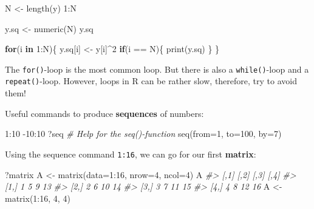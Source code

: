 \documentclass[
  14pt,
]{memoir}
\newenvironment{Shaded}{\begin{snugshade}}{\end{snugshade}}
\newcommand{\AttributeTok}[1]{\textcolor[rgb]{0.77,0.63,0.00}{#1}}
\newcommand{\CommentTok}[1]{\textcolor[rgb]{0.56,0.35,0.01}{\textit{#1}}}
\newcommand{\ControlFlowTok}[1]{\textcolor[rgb]{0.13,0.29,0.53}{\textbf{#1}}}
\newcommand{\DecValTok}[1]{\textcolor[rgb]{0.00,0.00,0.81}{#1}}
\newcommand{\FunctionTok}[1]{\textcolor[rgb]{0.00,0.00,0.00}{#1}}
\newcommand{\NormalTok}[1]{#1}
\newcommand{\OtherTok}[1]{\textcolor[rgb]{0.56,0.35,0.01}{#1}}
\newcommand{\SpecialCharTok}[1]{\textcolor[rgb]{0.00,0.00,0.00}{#1}}
\begin{document}
\begin{Shaded}
\begin{Highlighting}[]
\NormalTok{N }\OtherTok{\textless{}{-}} \FunctionTok{length}\NormalTok{(y)}
\DecValTok{1}\SpecialCharTok{:}\NormalTok{N}

\NormalTok{y.sq }\OtherTok{\textless{}{-}} \FunctionTok{numeric}\NormalTok{(N)}
\NormalTok{y.sq}

\ControlFlowTok{for}\NormalTok{(i }\ControlFlowTok{in} \DecValTok{1}\SpecialCharTok{:}\NormalTok{N)\{}
\NormalTok{  y.sq[i] }\OtherTok{\textless{}{-}}\NormalTok{ y[i]}\SpecialCharTok{\^{}}\DecValTok{2}
  \ControlFlowTok{if}\NormalTok{(i }\SpecialCharTok{==}\NormalTok{ N)\{}
    \FunctionTok{print}\NormalTok{(y.sq)}
\NormalTok{  \}}
\NormalTok{\}}
\end{Highlighting}
\end{Shaded}

The \texttt{for()}-loop is the most common loop. But there is also a \texttt{while()}-loop and a \texttt{repeat()}-loop. However, loops in R can be rather slow, therefore, try to avoid them!

Useful commands to produce \textbf{sequences} of numbers:

\begin{Shaded}
\begin{Highlighting}[]
\DecValTok{1}\SpecialCharTok{:}\DecValTok{10}
\SpecialCharTok{{-}}\DecValTok{10}\SpecialCharTok{:}\DecValTok{10}
\NormalTok{?seq }\CommentTok{\# Help for the seq(){-}function}
\FunctionTok{seq}\NormalTok{(}\AttributeTok{from=}\DecValTok{1}\NormalTok{, }\AttributeTok{to=}\DecValTok{100}\NormalTok{, }\AttributeTok{by=}\DecValTok{7}\NormalTok{)}
\end{Highlighting}
\end{Shaded}

Using the sequence command \texttt{1:16}, we can go for our first \textbf{matrix}:

\begin{Shaded}
\begin{Highlighting}[]
\NormalTok{?matrix}
\NormalTok{A }\OtherTok{\textless{}{-}} \FunctionTok{matrix}\NormalTok{(}\AttributeTok{data=}\DecValTok{1}\SpecialCharTok{:}\DecValTok{16}\NormalTok{, }\AttributeTok{nrow=}\DecValTok{4}\NormalTok{, }\AttributeTok{ncol=}\DecValTok{4}\NormalTok{)}
\NormalTok{A}
\CommentTok{\#\textgreater{}      [,1] [,2] [,3] [,4]}
\CommentTok{\#\textgreater{} [1,]    1    5    9   13}
\CommentTok{\#\textgreater{} [2,]    2    6   10   14}
\CommentTok{\#\textgreater{} [3,]    3    7   11   15}
\CommentTok{\#\textgreater{} [4,]    4    8   12   16}
\NormalTok{A }\OtherTok{\textless{}{-}} \FunctionTok{matrix}\NormalTok{(}\DecValTok{1}\SpecialCharTok{:}\DecValTok{16}\NormalTok{, }\DecValTok{4}\NormalTok{, }\DecValTok{4}\NormalTok{)}
\end{Highlighting}
\end{Shaded}
\end{document}
